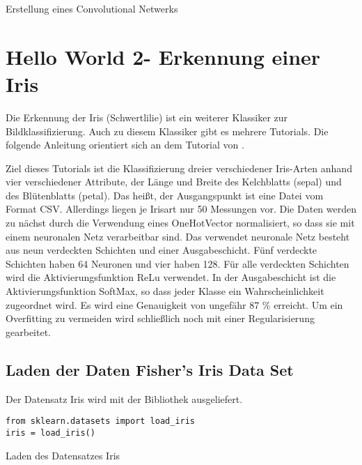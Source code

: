 \begin{code}

%
\caption{Erstellung eines Convolutional Netwerks}\label{TensorFlow:Complete}
\end{code}


\section{\glqq Hello World 2\grqq - Erkennung einer Iris}

Die Erkennung der Iris (Schwertlilie) ist ein weiterer Klassiker zur Bildklassifizierung. Auch zu diesem Klassiker gibt es mehrere Tutorials.  Die folgende Anleitung orientiert sich an dem Tutorial von \cite{KDnuggets.07.12.2020}.

Ziel dieses Tutorials ist die Klassifizierung dreier verschiedener Iris-Arten anhand vier verschiedener Attribute, der Länge und Breite des Kelchblatts (sepal) und des Blütenblatts (petal). Das heißt, der Ausgangspunkt ist eine Datei vom Format CSV. Allerdings liegen je Irisart nur 50 Messungen vor. Die Daten werden zu nächst durch die Verwendung eines \glqq OneHotVector\grqq{} normalisiert, so dass sie mit einem  neuronalen Netz verarbeitbar sind. Das verwendet neuronale Netz besteht aus neun verdeckten Schichten und einer Ausgabeschicht. Fünf verdeckte Schichten haben 64 Neuronen und vier haben 128. Für alle verdeckten Schichten wird die Aktivierungsfunktion ReLu verwendet. In der Ausgabeschicht ist die Aktivierungsfunktion SoftMax, so dass jeder Klasse ein Wahrscheinlichkeit zugeordnet wird. Es wird eine Genauigkeit von ungefähr 87 \% erreicht. Um ein Overfitting zu vermeiden wird schließlich noch mit einer Regularisierung gearbeitet.







\subsection{Laden der Daten Fisher's Iris Data Set}

Der Datensatz \glqq Iris\grqq{} wird mit der Bibliothek  ausgeliefert.

\begin{code}
    \begin{lstlisting}[numbers=none]
from sklearn.datasets import load_iris
iris = load_iris()
\end{lstlisting}
\caption{Laden des Datensatzes Iris}
\end{code}

